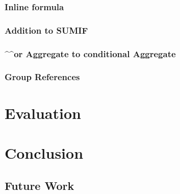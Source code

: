 \documentclass[12pt,a4paper,onecolumn,oneside]{memoir}
\begin{document}
\subsection{Inline formula}

\subsection{Addition to SUMIF}

\subsection{\textasciicircum\textasciicircum or Aggregate to conditional Aggregate}

\subsection{Group References}

\chapter{Evaluation}


\chapter{Conclusion}

\section{Future Work}



\end{document}
